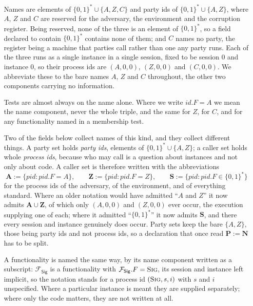 \documentclass[11pt,a4paper]{article}
\newcommand{\Ps}{\mathbf{P}}
\newcommand{\PID}{\mathit{pid}}
\newcommand{\admits}{\mathbf{N}}
\newcommand{\Apid}{\mathbf{A}}
\newcommand{\Zpid}{\mathbf{Z}}
\newcommand{\Spid}{\mathbf{S}}
\newcommand{\op}[1]{\textsc{#1}}
\newcommand{\id}{id}
\newcommand{\Fsig}{\mathcal{F}_{\mathsf{Sig}}}
\newcommand{\bits}{\{0,1\}^*}
\theoremstyle{accentdef}
\theoremstyle{accentplain}
\begin{document}
Names are elements of $\bits \cup \{A,Z,C\}$ and party ids of $\bits \cup \{A,Z\}$, where $A$, $Z$
and $C$ are reserved for the adversary, the environment and the corruption register. Being
reserved, none of the three is an element of $\bits$, so a field declared to contain $\bits$
contains none of them; and $C$ names no party, the register being a machine that parties call
rather than one any party runs. Each of the three runs as a single instance in a single session,
fixed to be session $0$ and instance $0$, so their process ids are $(A,0,0)$,
$(Z,0,0)$ and $(C,0,0)$. We abbreviate these to the bare names $A$, $Z$ and $C$ throughout, the
other two components carrying no information.

Tests are almost always on the name alone. Where we write $\id.F = A$ we mean the name component,
never the whole triple, and the same for $Z$, for $C$, and for any functionality named in a
membership test.

Two of the fields below collect names of this kind, and they collect different things. A party set holds \emph{party ids}, elements of $\bits \cup \{A,Z\}$; a caller set holds
whole \emph{process ids}, because who may call is a question about instances and not only about
code. A caller set is therefore written with the abbreviations
\[
  \Apid := \{\PID : \PID.F = A\}, \qquad
  \Zpid := \{\PID : \PID.F = Z\}, \qquad
  \Spid := \{\PID : \PID.F \in \bits\}
\]
for the process ids of the adversary, of the environment, and of everything standard. Where an
older notation would have admitted ``$A$ and $Z$'' it now admits $\Apid \cup \Zpid$, of which only
$(A,0,0)$ and $(Z,0,0)$ ever occur, the execution supplying one of each; where it admitted
``$\bits$'' it now admits $\Spid$, and there every session and instance genuinely does occur. Party sets keep the
bare $\{A,Z\}$, those being party ids and not process ids, so a declaration that once read
$\Ps := \admits$ has to be split.

A functionality is named the same way, by its name component written as a subscript: $\Fsig$ is a
functionality with $\Fsig.F = \op{Sig}$, its session and instance left implicit, so the notation
stands for a process id $(\op{Sig},s,i)$ with $s$ and $i$ unspecified. Where a particular instance
is meant they are supplied separately; where only the code matters, they are not written at all.
\end{document}
